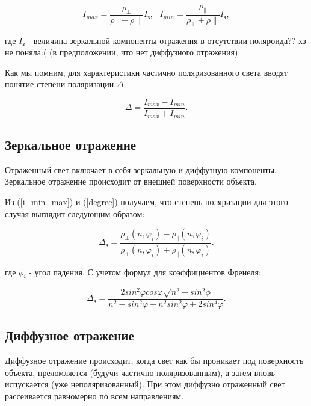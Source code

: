 \documentclass[a4paper]{article}
\begin{document}
\begin{equation}
I_{max} = \frac{\rho_{\perp}}{\rho_{\perp}+\rho{\parallel}}I_\text{з}, \text{      } I_{min} = \frac{\rho_{\parallel}}{\rho_{\perp}+\rho{\parallel}}I_\text{з},
\label{i_min_max}
\end{equation}

где $I_\text{з}$ - величина зеркальной компоненты отражения в отсутствии поляроида?? хз не поняла:( (в предположении, что нет диффузного отражения).

Как мы помним, для характеристики частично
поляризованного света вводят понятие степени поляризации $\Delta$

\begin{equation}
\Delta = \frac{I_{max} - I_{min}}{I_{max} + I_{min}}.
\label{degree}
\end{equation}

\subsection*{\textcolor{sub_header}{Зеркальное отражение}}

Отраженный свет включает в себя зеркальную и диффузную компоненты. Зеркальное отражение происходит от внешней поверхности объекта.

Из (\ref{i_min_max}) и (\ref{degree}) получаем, что степень поляризации для этого случая выглядит следующим образом:

\begin{equation}
\Delta_{\text{з}} = \frac{\rho_{\perp}(n, \varphi_i) - \rho_{\parallel}(n, \varphi_i)}{\rho_{\perp}(n, \varphi_i) + \rho_{\parallel}(n, \varphi_i)}.
\end{equation}

где $\phi_i$ - угол падения. С учетом формул для коэффициентов Френеля:

\begin{equation}
\Delta_{\text{з}} = \frac{2sin^2\varphi cos\varphi \sqrt{n^2 - sin^2\phi}}{n^2 - sin^2\varphi- n^2sin^2\varphi+2sin^4\varphi}.
\end{equation}

\subsection*{\textcolor{sub_header}{Диффузное отражение}}

Диффузное отражение происходит, когда свет как бы проникает под поверхность объекта, преломляется (будучи частично поляризованным), а затем вновь испускается (уже неполяризованный). При этом диффузно отраженный свет рассеивается равномерно по всем направлениям. 
\end{document}
